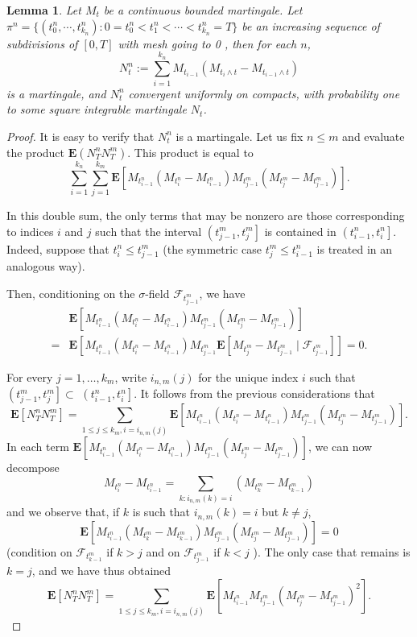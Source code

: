 \documentclass[twoside, 12pt]{book}
\numberwithin{equation}{chapter}
\newtheorem{lemma}[theorem]{Lemma}
\def\bE{{\mathbf E}}
\def\leq{\leqslant}
\begin{document}
	\begin{lemma}
		Let $M_t$ be a continuous bounded martingale.  Let $\pi^n=\{(t_0^n,\cdots, t_{k_n}^n): 0=t_0^n<t_1^n<\cdots<t_{k_n}^n=T\}$ be an increasing sequence of subdivisions of $[0, T]$ with mesh going to 0 , then for each $n$, 
		$$
		N^n_t:= \sum_{i=1}^{k_n}M_{t_{i-1}}(M_{t_i\wedge t}-M_{t_{i-1}\wedge t})
		$$ 
		is a martingale, and $N^n_t$ convergent uniformly on compacts, with probability one to some square integrable martingale $N_t$. 
	\end{lemma}
	\begin{proof}
		It is easy to verify that $N_t^n$ is a martingale. 
		Let us fix $n \leq m$ and evaluate the product $\bE\left(N_T^n N_T^m\right)$. This product is equal to
		$$
		\sum_{i=1}^{k_n} \sum_{j=1}^{k_m} \bE\left[M_{t_{i-1}^n}\left(M_{t_i^n}-M_{t_{i-1}^n}\right) M_{t_{j-1}^m}\left(M_{t_j^m}-M_{t_{j-1}^m}\right)\right] .
		$$
		
		In this double sum, the only terms that may be nonzero are those corresponding to indices $i$ and $j$ such that the interval $\left(t_{j-1}^m, t_j^m\right]$ is contained in $\left(t_{i-1}^n, t_i^n\right]$. Indeed, suppose that $t_i^n \leq t_{j-1}^m$ (the symmetric case $t_j^m \leq t_{i-1}^n$ is treated in an analogous way).
		
		Then, conditioning on the $\sigma$-field $\mathscr{F}_{t_{j-1}^m}$, we have
		$$
		\begin{aligned}
			& \bE\left[M_{t_{i-1}^n}\left(M_{t_i^n}-M_{t_{i-1}^n}\right) M_{t_{j-1}^m}\left(M_{t_j^m}-M_{t_{j-1}^m}\right)\right] \\
		    =& \bE\left[M_{t_{i-1}^n}\left(M_{t_i^n}-M_{t_{i-1}^n}\right) M_{t_{j-1}^m} \bE\left[M_{t_j^m}-M_{t_{j-1}^m} \mid \mathscr{F}_{t_{j-1}^m}\right]\right]=0 .
		\end{aligned}
		$$
		
		For every $j=1, \ldots, k_m$, write $i_{n, m}(j)$ for the unique index $i$ such that $\left(t_{j-1}^m, t_j^m\right] \subset$ $\left(t_{i-1}^n, t_i^n\right]$. It follows from the previous considerations that
		$$
		\bE\left[N_T^n N_T^m\right]=\sum_{1 \leq j \leq k_m, i=i_{n, m}(j)} \bE\left[M_{t_{i-1}^n}\left(M_{t_i^n}-M_{t_{i-1}^n}\right) M_{t_{j-1}^m}\left(M_{t_j^m}-M_{t_{j-1}^m}\right)\right] .
		$$
		In each term $\bE\left[M_{t_{i-1}^n}\left(M_{t_i^n}-M_{t_{i-1}^n}\right) M_{t_{j-1}^m}\left(M_{t_j^m}-M_{t_{j-1}^m}\right)\right]$, we can now decompose
		$$
		M_{t_i^n}-M_{t_{i-1}^n}=\sum_{k: i_{n, m}(k)=i}\left(M_{t_k^m}-M_{t_{k-1}^m}\right)
		$$
		and we observe that, if $k$ is such that $i_{n, m}(k)=i$ but $k \neq j$,
		$$
	    \bE\left[M_{t_{i-1}^n}\left(M_{t_k^m}-M_{t_{k-1}^m}\right) M_{t_{j-1}^m}\left(M_{t_j^m}-M_{t_{j-1}^m}\right)\right]=0
		$$
		(condition on $\mathscr{F}_{t_{k-1}^m}$ if $k>j$ and on $\mathscr{F}_{t_{j-1}^m}$ if $k<j$ ). The only case that remains is $k=j$, and we have thus obtained
		$$
		\bE\left[N_T^n N_T^m\right]=\sum_{1 \leq j \leq k_m, i=i_{n, m}(j)} \bE\left[M_{t_{i-1}^n} M_{t_{j-1}^m}\left(M_{t_j^m}-M_{t_{j-1}^m}\right)^2\right] .
		$$
		

\end{proof}
\end{document}
